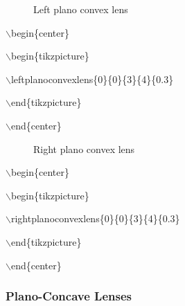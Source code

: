 \documentclass[12pt]{article}
\begin{document}
\begin{minipage}{\textwidth}
\begin{minipage}{0.5\textwidth}

\begin{figure}[H]

\begin{center}


\end{center}

\caption{Left plano convex lens}
\end{figure}

$\backslash$begin\{center\}

$\backslash$begin\{tikzpicture\}

$\backslash$leftplanoconvexlens\{0\}\{0\}\{3\}\{4\}\{0.3\}

$\backslash$end\{tikzpicture\}

$\backslash$end\{center\}
\end{minipage}
\begin{minipage}{0.5\textwidth}

\begin{figure}[H]

\begin{center}


\end{center}

\caption{Right plano convex lens}
\end{figure}

$\backslash$begin\{center\}

$\backslash$begin\{tikzpicture\}

$\backslash$rightplanoconvexlens\{0\}\{0\}\{3\}\{4\}\{0.3\}

$\backslash$end\{tikzpicture\}

$\backslash$end\{center\}
\end{minipage}
\end{minipage}

\subsubsection{Plano-Concave Lenses}
\end{document}
